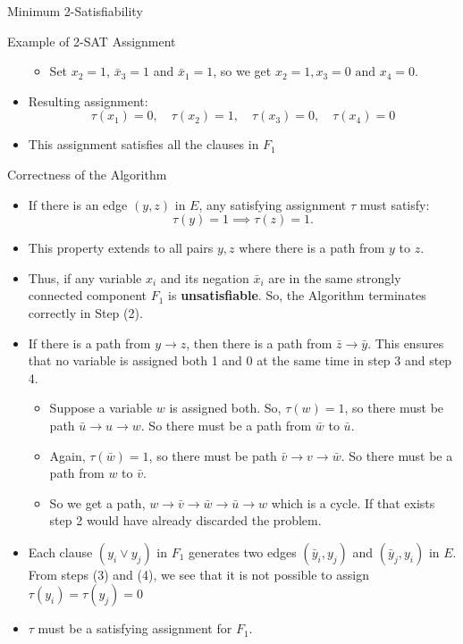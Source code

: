 \documentclass[xcolor=svgnames]{beamer}
\begin{document}
\begin{section}{Minimum 2-Satisfiability}
\begin{frame}{Example of 2-SAT Assignment}
\begin{itemize}
{\begin{itemize}
                    \item Set \(x_2 = 1\), $\bar{x}_3=1$ and $\bar{x}_1=1$, so we get \(x_2=1,x_3=0 \text{ and }x_4 = 0\).
                \end{itemize}
            }
            \vspace{-2.5em}
            \item<5-> Resulting assignment:
            \[
            \tau(x_1) = 0, \quad \tau(x_2) = 1, \quad \tau(x_3) = 0, \quad \tau(x_4) = 0
            \]
            \item<5-> This assignment satisfies all the clauses in $F_1$ 
        \end{itemize}
    \end{frame}
\begin{frame}{Correctness of the Algorithm}
    \begin{itemize}
        \item<1->   
        If there is an edge \((y, z)\) in \(E\), any satisfying assignment \(\tau\) must satisfy:  
        \[
        \tau(y) = 1 \implies \tau(z) = 1.
        \]
        \item<2-> 
        This property extends to all pairs \(y, z\) where there is a path from \(y\) to \(z\).
        \item<3-> Thus, if any variable \(x_i\) and its negation \(\bar{x}_i\) are in the same strongly connected component \(F_1\) is \textbf{unsatisfiable}. So, the Algorithm terminates correctly in Step (2).
        \item<4-> If there is a path from \(y \to z\), then there is a path from \(\bar{z} \to \bar{y}\). This ensures that no variable is assigned both 1 and 0 at the same time in step 3 and step 4.
        {
        \begin{itemize}
            \item<5-7> Suppose a variable $w$ is assigned both. So, $\tau(w)=1$, so there must be path $\bar{u} \rightarrow {u} \rightarrow w $. So there must be a path from $\bar{w}$ to $\bar{u}$.
            \item<6-7> Again, $\tau(\bar{w})=1$, so there must be path $\bar{v} \rightarrow v \rightarrow \bar{w} $. So there must be a path from ${w}$ to $\bar{v}$.
            \item<7> So we get a path, $w\rightarrow \bar{v} \rightarrow \bar{w} \rightarrow \bar{u} \rightarrow w$ which is a cycle. If that exists step 2 would have already discarded the problem.
        \end{itemize}
        }
        \item<8-> Each clause $(y_i \lor y_j )$ in $F_1$ generates two edges $(\bar{y}_i, y_j)$ and $(\bar{y}_j , y_i)$ in $E$. From steps (3) and (4), we see that it is not possible to assign $\tau (y_i) = \tau (y_j )=0$ 
        \item <9> $\tau$ must be a satisfying assignment for $F_1$.
    \end{itemize}
\end{frame}

\end{section}
\end{document}

